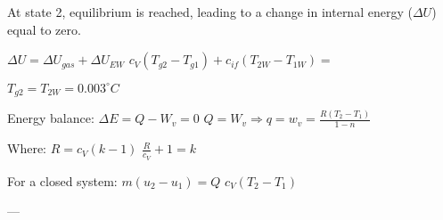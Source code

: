 At state 2, equilibrium is reached, leading to a change in internal energy (\( \Delta U \)) equal to zero.  

\( \Delta U = \Delta U_{gas} + \Delta U_{EW} \)  
\( c_V (T_{g2} - T_{g1}) + c_{if} (T_{2W} - T_{1W}) = \)  

\( T_{g2} = T_{2W} = 0.003^\circ C \)  

Energy balance:  
\( \Delta E = Q - W_v = 0 \)  
\( Q = W_v \Rightarrow q = w_v = \frac{R(T_2 - T_1)}{1 - n} \)  

Where:  
\( R = c_V (k - 1) \)  
\( \frac{R}{c_V} + 1 = k \)  

For a closed system:  
\( m(u_2 - u_1) = Q \)  
\( c_V (T_2 - T_1) \)  

---